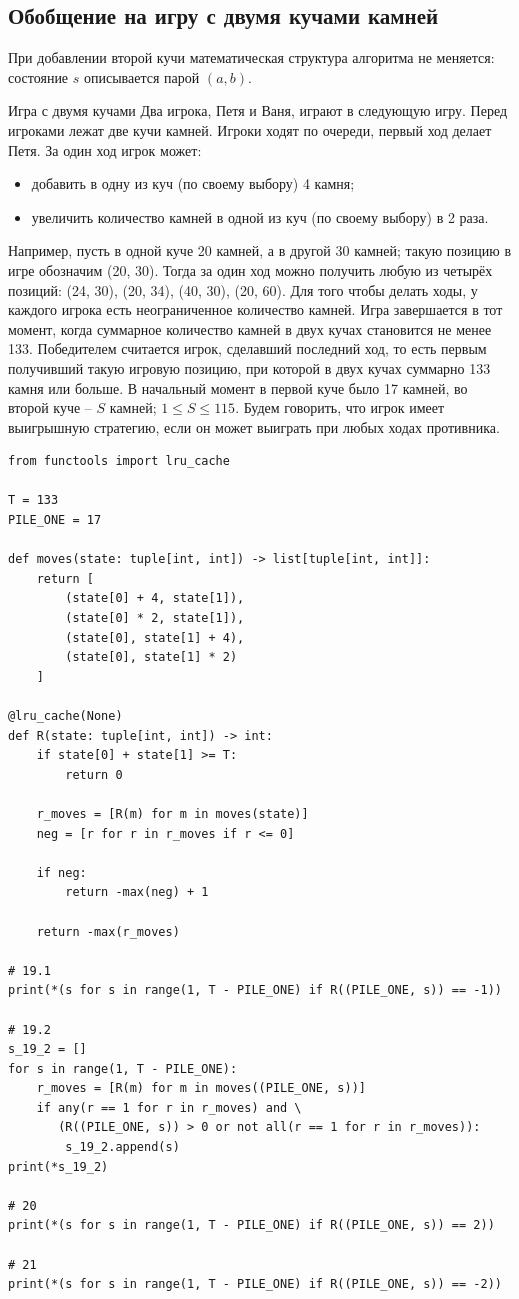 \documentclass[11pt,a4paper]{article}
\begin{document}
\subsection{Обобщение на игру с двумя кучами камней}

При добавлении второй кучи математическая структура алгоритма не меняется: состояние $s$ описывается парой $(a, b)$.

\begin{taskbox}{Игра с двумя кучами}
Два игрока, Петя и Ваня, играют в следующую игру. Перед игроками лежат две кучи камней. Игроки ходят по очереди, первый ход делает Петя.
За один ход игрок может:
\begin{itemize}
    \item добавить в одну из куч (по своему выбору) 4 камня;
    \item увеличить количество камней в одной из куч (по своему выбору) в 2 раза.
\end{itemize}
Например, пусть в одной куче 20 камней, а в другой 30 камней; такую позицию в игре обозначим (20, 30). Тогда за один ход можно получить любую из четырёх позиций: (24, 30), (20, 34), (40, 30), (20, 60).
Для того чтобы делать ходы, у каждого игрока есть неограниченное количество камней.
Игра завершается в тот момент, когда суммарное количество камней в двух кучах становится не менее 133. Победителем считается игрок, сделавший последний ход, то есть первым получивший такую игровую позицию, при которой в двух кучах суммарно 133 камня или больше.
В начальный момент в первой куче было 17 камней, во второй куче – $S$ камней; $1 \le S \le 115$.
Будем говорить, что игрок имеет выигрышную стратегию, если он может выиграть при любых ходах противника.
\end{taskbox}

\begin{verbatim}
from functools import lru_cache

T = 133
PILE_ONE = 17

def moves(state: tuple[int, int]) -> list[tuple[int, int]]:
    return [
        (state[0] + 4, state[1]), 
        (state[0] * 2, state[1]), 
        (state[0], state[1] + 4), 
        (state[0], state[1] * 2)
    ]

@lru_cache(None)
def R(state: tuple[int, int]) -> int:
    if state[0] + state[1] >= T:
        return 0

    r_moves = [R(m) for m in moves(state)]
    neg = [r for r in r_moves if r <= 0]

    if neg:
        return -max(neg) + 1

    return -max(r_moves)

# 19.1
print(*(s for s in range(1, T - PILE_ONE) if R((PILE_ONE, s)) == -1))

# 19.2
s_19_2 = []
for s in range(1, T - PILE_ONE):
    r_moves = [R(m) for m in moves((PILE_ONE, s))]
    if any(r == 1 for r in r_moves) and \
       (R((PILE_ONE, s)) > 0 or not all(r == 1 for r in r_moves)):
        s_19_2.append(s)
print(*s_19_2)

# 20
print(*(s for s in range(1, T - PILE_ONE) if R((PILE_ONE, s)) == 2))

# 21
print(*(s for s in range(1, T - PILE_ONE) if R((PILE_ONE, s)) == -2))
\end{verbatim}
\end{document}
